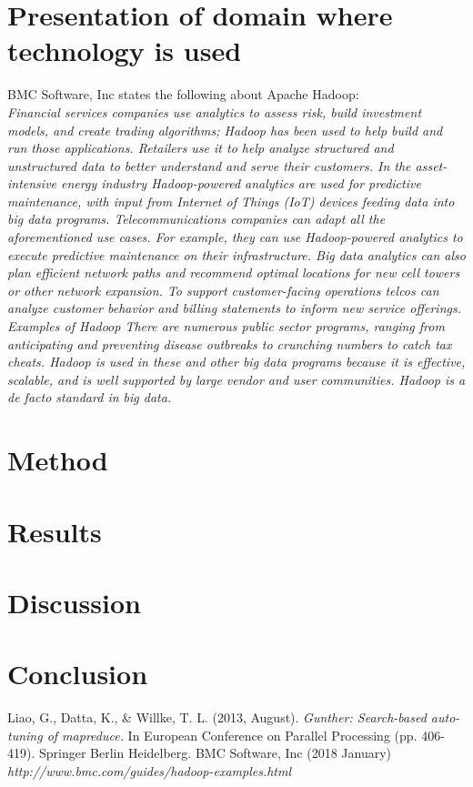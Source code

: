 \documentclass[a4paper,english]{report}
\begin{document}
	\chapter{Presentation of domain where technology is used}
		BMC Software, Inc states the following about Apache Hadoop:\\
		\emph{Financial services companies use analytics to assess risk, build investment models, and create trading algorithms; Hadoop has been used to help build and run those applications.
		Retailers use it to help analyze structured and unstructured data to better understand and serve their customers.
		In the asset-intensive energy industry Hadoop-powered analytics are used for predictive maintenance, with input from Internet of Things (IoT) devices feeding data into big data programs.
		Telecommunications companies can adapt all the aforementioned use cases. For example, they can use Hadoop-powered analytics to execute predictive maintenance on their infrastructure. Big data analytics can also plan efficient network paths and recommend optimal locations for new cell towers or other network expansion. To support customer-facing operations telcos can analyze customer behavior and billing statements to inform new service offerings. Examples of Hadoop
		There are numerous public sector programs, ranging from anticipating and preventing disease outbreaks to crunching numbers to catch tax cheats.
		Hadoop is used in these and other big data programs because it is effective, scalable, and is well supported by large vendor and user communities. Hadoop is a de facto standard in big data.}\cite{bmc}
	\chapter{Method}
	\chapter{Results}
	\chapter{Discussion}
	\chapter{Conclusion}
	\begin{thebibliography}{1}
		
		Liao, G., Datta, K., \& Willke, T. L. (2013, August). \emph{Gunther: Search-based auto-tuning of mapreduce.} In European Conference on Parallel Processing (pp. 406-419). Springer Berlin Heidelberg.
		BMC Software, Inc (2018 January) \emph{http://www.bmc.com/guides/hadoop-examples.html}
	\end{thebibliography}
\end{document}
